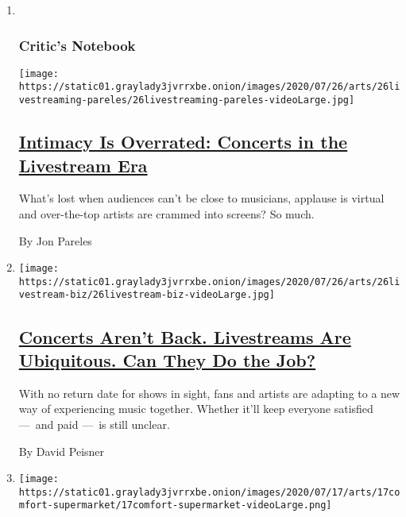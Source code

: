 \begin{enumerate}
\def\labelenumi{\arabic{enumi}.}
\item ~
  \hypertarget{critics-notebook-1}{%
  \subsubsection{Critic's Notebook}\label{critics-notebook-1}}

  \texttt{[image: https://static01.graylady3jvrrxbe.onion/images/2020/07/26/arts/26livestreaming-pareles/26livestreaming-pareles-videoLarge.jpg]}

  \hypertarget{intimacy-is-overrated-concerts-in-the-livestream-era}{%
  \subsection{\texorpdfstring{\href{/2020/07/21/arts/music/livestreams-intimacy.html}{Intimacy
  Is Overrated: Concerts in the Livestream
  Era}}{Intimacy Is Overrated: Concerts in the Livestream Era}}\label{intimacy-is-overrated-concerts-in-the-livestream-era}}

  What's lost when audiences can't be close to musicians, applause is
  virtual and over-the-top artists are crammed into screens? So much.

  By Jon Pareles
\item
  \texttt{[image: https://static01.graylady3jvrrxbe.onion/images/2020/07/26/arts/26livestream-biz/26livestream-biz-videoLarge.jpg]}

  \hypertarget{concerts-arent-back-livestreams-are-ubiquitous-can-they-do-the-job}{%
  \subsection{\texorpdfstring{\href{/2020/07/21/arts/music/concerts-livestreams.html}{Concerts
  Aren't Back. Livestreams Are Ubiquitous. Can They Do the
  Job?}}{Concerts Aren't Back. Livestreams Are Ubiquitous. Can They Do the Job?}}\label{concerts-arent-back-livestreams-are-ubiquitous-can-they-do-the-job}}

  With no return date for shows in sight, fans and artists are adapting
  to a new way of experiencing music together. Whether it'll keep
  everyone satisfied ---~and paid ---~is still unclear.

  By David Peisner
\item
  \texttt{[image: https://static01.graylady3jvrrxbe.onion/images/2020/07/17/arts/17comfort-supermarket/17comfort-supermarket-videoLarge.png]}


\end{enumerate}
